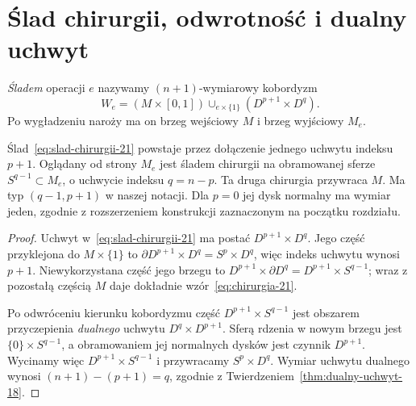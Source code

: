 \section{Ślad chirurgii, odwrotność i dualny uchwyt}
\label{sec:slad-chirurgii-21}

\begin{definicja}
\label{def:slad-chirurgii-21}
\emph{Śladem} operacji $e$ nazywamy $(n+1)$-wymiarowy
kobordyzm
\begin{equation}\label{eq:slad-chirurgii-21}
 W_e=(M\times[0,1])\cup_{e\times\{1\}}
        (D^{p+1}\times D^q).
\end{equation}
Po wygładzeniu naroży ma on brzeg wejściowy $M$
i brzeg wyjściowy $M_e$.
\end{definicja}

\begin{twierdzenie}
\label{thm:odwrotna-chirurgia-21}
Ślad~\eqref{eq:slad-chirurgii-21} powstaje przez
dołączenie jednego uchwytu indeksu $p+1$.
Oglądany od strony $M_e$ jest śladem chirurgii
na obramowanej sferze $S^{q-1}\subset M_e$,
o uchwycie indeksu $q=n-p$.
Ta druga chirurgia przywraca $M$.
Ma typ $(q-1,p+1)$ w naszej notacji. Dla $p=0$
jej dysk normalny ma wymiar jeden, zgodnie z rozszerzeniem
konstrukcji zaznaczonym na początku rozdziału.
\end{twierdzenie}
\begin{proof}
Uchwyt w~\eqref{eq:slad-chirurgii-21} ma postać
$D^{p+1}\times D^q$. Jego część przyklejona do
$M\times\{1\}$ to $\partial D^{p+1}\times D^q
=S^p\times D^q$, więc indeks uchwytu wynosi $p+1$.
Niewykorzystana część jego brzegu to
$D^{p+1}\times\partial D^q=D^{p+1}\times S^{q-1}$;
wraz z pozostałą częścią $M$ daje dokładnie
wzór~\eqref{eq:chirurgia-21}.

Po odwróceniu kierunku kobordyzmu część
$D^{p+1}\times S^{q-1}$ jest obszarem
przyczepienia \emph{dualnego} uchwytu
$D^q\times D^{p+1}$. Sferą rdzenia w nowym
brzegu jest $\{0\}\times S^{q-1}$, a obramowaniem
jej normalnych dysków jest czynnik $D^{p+1}$.
Wycinamy więc $D^{p+1}\times S^{q-1}$
i przywracamy $S^p\times D^q$.
Wymiar uchwytu dualnego wynosi
$(n+1)-(p+1)=q$, zgodnie z
Twierdzeniem~\ref{thm:dualny-uchwyt-18}.
\end{proof}

